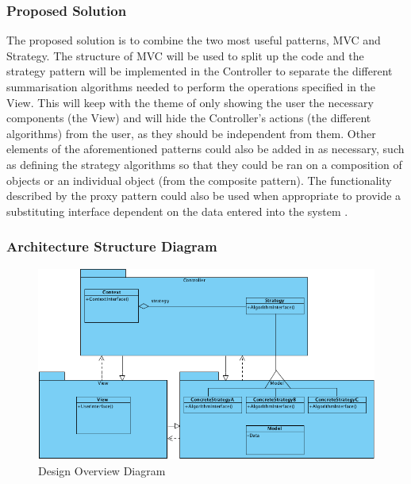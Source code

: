 \subsubsection{Proposed Solution}
The proposed solution is to combine the two most useful patterns, MVC and Strategy. The structure of MVC will be used to split up the code 
and the strategy pattern will be implemented in the Controller to separate the different summarisation algorithms needed to perform the 
operations specified in the View. This will keep with the theme of only showing the user the necessary components (the View) and will 
hide the Controller's actions (the different algorithms) from the user, as they should be independent from them. Other elements of the 
aforementioned patterns could also be added in as necessary, such as defining the strategy algorithms so that they could be ran on a 
composition of objects or an individual object (from the composite pattern). The functionality described by the proxy pattern could also be 
used when appropriate to provide a substituting interface dependent on the data entered into the system \cite{designRef}.

\subsubsection{Architecture Structure Diagram}
\begin{figure}[h1]
\begin{center}
\includegraphics[trim = 0mm 0mm 0mm 0mm, clip, scale=0.61]{Images/StructureDiagram.png}
\end{center}
\caption{Design Overview Diagram}
\end{figure}

\newpage

